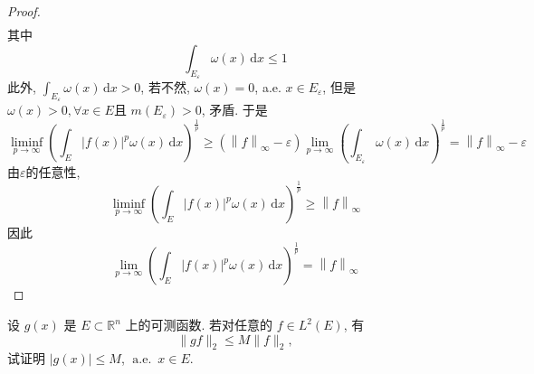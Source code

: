 \documentclass[../main.tex]{subfiles}
\begin{document}
\begin{proof}
\[\begin{aligned}
    \end{aligned}
    \]  其中 \[
    \int_{E_{ \varepsilon }} \omega \left( x \right)\,\mathrm{d} x\le 1 
    \]此外,  \(  \int_{E_{ \varepsilon }} \omega \left( x \right)\,\mathrm{d} x> 0   \), 若不然,  \(   \omega \left( x \right)= 0   \), a.e. \(  x\in E_{ \varepsilon }  \), 但是 \(   \omega \left( x \right)> 0  , \forall x\in E \)且 \(  m\left( E_{ \varepsilon } \right)> 0   \), 矛盾.     于是 \[
    \liminf_{p\to \infty}\left( \int_{E}\left| f\left( x \right)  \right|^{p} \omega \left( x \right)   \,\mathrm{d} x\right)^{\frac{1}{p}}\ge \left( \left\| f \right\|_{\infty}- \varepsilon  \right)\lim_{p\to \infty}\left( \int_{E_{ \varepsilon }} \omega \left( x \right)\,\mathrm{d} x  \right)^{\frac{1}{p}} = \left\| f \right\|_{\infty}- \varepsilon   
    \]由\(   \varepsilon   \)的任意性,  \[
    \liminf_{p\to \infty}\left( \int_{E}\left| f\left( x \right)  \right|^{p} \omega \left( x \right)\,\mathrm{d} x   \right)^{\frac{1}{p}}\ge \left\| f \right\|_{\infty} 
    \] 因此 \[
    \lim_{p\to \infty}\left( \int_{E}\left| f\left( x \right)  \right|^{p} \omega \left( x \right)\,\mathrm{d} x   \right)^{\frac{1}{p}}= \left\| f \right\|_{\infty} 
    \]
\end{proof}

\begin{exercise}{}{}
设 \(g(x)\) 是 \(E\subset\mathbb{R}^{n}\) 上的可测函数. 若对任意的 \(f\in L^{2}(E)\), 有
\[
\lVert gf\rVert_{2} \leq M \lVert f\rVert_{2},
\]
试证明 \(\lvert g(x)\rvert \leq M\), \(\operatorname{a.e.}\ x\in E\).
\end{exercise}
\end{document}
